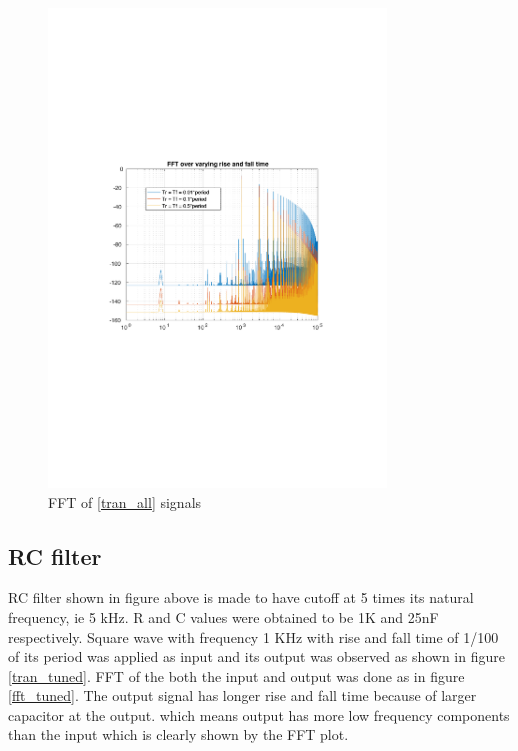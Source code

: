 \documentclass[12pt,a4paper,UKenglish]{article}
\begin{document}
\begin{figure} [H]
  \centering 
  \includegraphics[width=0.8\textwidth]{img/2b_fft.pdf} 
  \caption{FFT of \ref{tran_all} signals}
  \label{fft_all} 
\end{figure}


\subsection{RC filter}
RC filter shown in figure above is made to have cutoff at 5 times its natural frequency, ie 5 kHz. R and C values were obtained to be 1K and 25nF respectively. Square wave with frequency 1 KHz with rise and fall time of 1/100 of its period  was applied as input and its output was observed as shown in figure \ref{tran_tuned}.
FFT of the both the input and output was done as in figure \ref{fft_tuned}. The output signal has longer rise and fall time because of larger capacitor at the output. which means output has more low frequency components than the input which is clearly shown by the FFT plot.
\end{document}
